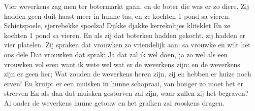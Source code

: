 \beginverse*
Vier weverkens zag men ter botermarkt gaan, en de boter die was er zo diere.
Zij hadden geen duit haast meer in hunne tas, en ze kochten 1 pond sa vieren.
\endverse
\beginverse*
Schietspoele, sjerrebekke spoelza! Djikke djakke kerrekoltjes klitsklet
En ze kochten 1 pond sa vieren.
\endverse
\beginverse*
En als zij dat boterken hadden gekocht, zij hadden er vier platelen.
Zij spraken dat vrouwken zo vriendelijk aan: sa vrouwke en wilt het ons dele
\endverse
\beginverse*
Dat vrouwken dat sprak: Ja dat zal ik wel doen,
ja zo wel als een vrouwken vol eren
want ik wete wel wat er de weverkens zijn: en de weverkens zijn er geen her;
Wat zouden de weverkens heren zijn, zij en hebben er huize noch erven!
En kruipt er een muisken in hunne schapraai, van honger zo moet het er strerven
\endverse
\beginverse*
En als dan dat muisken gestorven zal zijn, waar zullen zij het begraven?
Al onder de weverkens hunne getouw en het grafken zal rooskens dragen.
\endverse
\endsong
